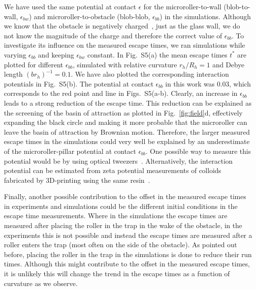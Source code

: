 \documentclass[12pt]{article}
\begin{document}
We have used the same potential at contact $\epsilon$ for the microroller-to-wall (blob-to-wall, $\epsilon_{bw}$) and microroller-to-obstacle (blob-blob, $\epsilon_{bb}$) in the simulations. 
Although we know that the obstacle is negatively charged~\cite{baker2019shape}, just as the glass wall, we do not know the magnitude of the charge and therefore the correct value of $\epsilon_{bb}$. To investigate its influence on the measured escape times, we ran simulations while varying $\epsilon_{bb}$ and keeping $\epsilon_{bw}$ constant. 
In Fig.~S5(a) the mean escape times $t^*$ are plotted for different $\epsilon_{bb}$, simulated with relative curvature $r_h/R_h=1$ and Debye length $(br_h)^{-1}=0.1$. We have also plotted the corresponding interaction potentials in Fig.~S5(b).
The potential at contact $\epsilon_{bb}$ in this work was 0.03, which corresponds to the red point and line in Figs.~S5(a-b).
Clearly, an increase in $\epsilon_{bb}$ leads to a strong reduction of the escape time. 
This reduction can be explained as the screening of the basin of attraction as plotted in Fig.~\ref{fig:field}d, effectively expanding the black circle and making it more probable that the microroller can leave the basin of attraction by Brownian motion.
Therefore, the larger measured escape times in the simulations could very well be explained by an underestimate of the microroller-pillar potential at contact $\epsilon_{bb}$.
One possible way to measure this potential would be by using optical tweezers~\cite{grier1997optical}. Alternatively, the interaction potential can be estimated from zeta potential measurements of colloids fabricated by 3D-printing using the same resin~\cite{baker2019shape,saraswat2020shape,doherty2020catalytically}.

Finally, another possible contribution to the offset in the measured escape times in experiments and simulations could be the different initial conditions in the escape time measurements. Where in the simulations the escape times are measured after placing the roller in the trap in the wake of the obstacle, in the experiments this is not possible and instead the escape times are measured after a roller enters the trap (most often on the side of the obstacle). As pointed out before, placing the roller in the trap in the simulations is done to reduce their run times. Although this might contribute to the offset in the measured escape times, it is unlikely this will change the trend in the escape times as a function of curvature as we observe.
\end{document}
